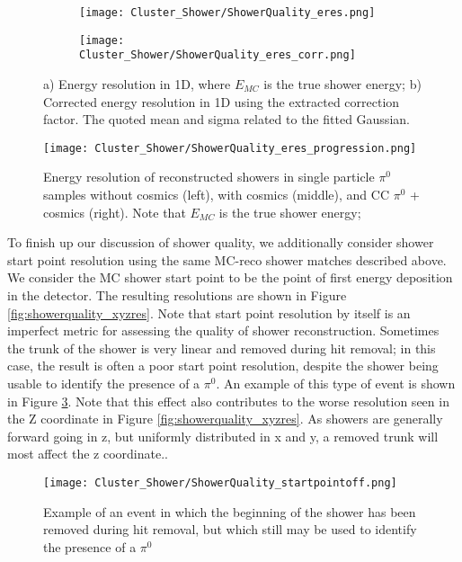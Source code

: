 \begin{figure}[t!]
\centering
  \begin{subfigure}[t]{0.4\textwidth}
    \centering
\texttt{[image: Cluster\_Shower/ShowerQuality\_eres.png]}
  \caption{ }
  \end{subfigure} 
  \hspace{10mm}
  \begin{subfigure}[t]{0.4\textwidth}
    \centering
\texttt{[image: Cluster\_Shower/ShowerQuality\_eres\_corr.png]}
  \caption{ }
  \end{subfigure} 
\caption{a) Energy resolution in 1D, where $E_{MC}$ is the true shower energy; b) Corrected energy resolution in 1D using the extracted correction factor. The quoted mean and sigma related to the fitted Gaussian.}
\label{fig:showerquality_eres_corr}
\end{figure}

\begin{figure}[t!]
\centering
 \texttt{[image: Cluster\_Shower/ShowerQuality\_eres\_progression.png]}
 \caption{Energy resolution of reconstructed showers in single particle $\pi^0$ samples without cosmics (left), with cosmics (middle), and CC $\pi^0$ + cosmics (right). Note that $E_{MC}$ is the true shower energy; }
\label{fig:showerquality_eres_series}
\end{figure}


To finish up our discussion of shower quality, we additionally consider shower start point resolution using the same MC-reco shower matches described above. We consider the MC shower start point to be the point of first energy deposition in the detector. The resulting resolutions are shown in Figure \ref{fig:showerquality_xyzres}. Note that start point resolution by itself is an imperfect metric for assessing the quality of shower reconstruction. Sometimes the trunk of the shower is very linear and removed during hit removal; in this case, the result is often a poor start point resolution, despite the shower being usable to identify the presence of a $\pi^0$. An example of this type of event is shown in Figure \ref{fig:showerquality_startpointoff}.  Note that this effect also contributes to the worse resolution seen in the Z coordinate in Figure \ref{fig:showerquality_xyzres}. As showers are generally forward going in z, but uniformly distributed in x and y, a removed trunk will most affect the z coordinate..

\begin{figure}[h!]
\centering
\texttt{[image: Cluster\_Shower/ShowerQuality\_startpointoff.png]}
\caption{Example of an event in which the beginning of the shower has been removed during hit removal, but which still may be used to identify the presence of a $\pi^0$ }
\label{fig:showerquality_startpointoff}
\end{figure}


